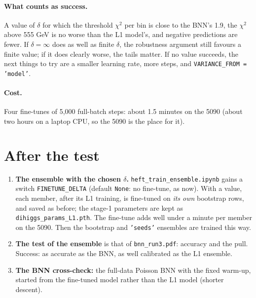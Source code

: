 \documentclass[11pt]{article}
\newcommand{\file}[1]{\nolinkurl{#1}}
\newcommand{\code}[1]{\texttt{#1}}
\begin{document}
\paragraph{What counts as success.} A value of $\delta$ for which the threshold $\chi^2$
per bin is close to the BNN's 1.9, the $\chi^2$ above 555 GeV is no worse than the L1
model's, and negative predictions are fewer. If $\delta = \infty$ does as well as finite
$\delta$, the robustness argument still favours a finite value; if it does clearly worse,
the tails matter. If no value succeeds, the next things to try are a smaller learning rate,
more steps, and \code{VARIANCE\_FROM = 'model'}.

\paragraph{Cost.} Four fine-tunes of 5,000 full-batch steps: about 1.5 minutes on the 5090
(about two hours on a laptop CPU, so the 5090 is the place for it).

\section{After the test}
\label{sec:after}

\begin{enumerate}
  \item \textbf{The ensemble with the chosen $\delta$.} \file{heft_train_ensemble.ipynb}
    gains a switch \code{FINETUNE\_DELTA} (default \code{None}: no fine-tune, as now). With
    a value, each member, after its L1 training, is fine-tuned on \emph{its own} bootstrap
    rows, and saved as before; the stage-1 parameters are kept as
    \file{dihiggs_params_L1.pth}. The fine-tune adds well under a minute per member on the
    5090. Then the bootstrap and \code{'seeds'} ensembles are trained this way.
  \item \textbf{The test of the ensemble} is that of \file{bnn_run3.pdf}: accuracy and the
    pull. Success: as accurate as the BNN, as well calibrated as the L1 ensemble.
  \item \textbf{The BNN cross-check:} the full-data Poisson BNN with the fixed warm-up,
    started from the fine-tuned model rather than the L1 model (shorter descent).
\end{enumerate}

\end{document}
